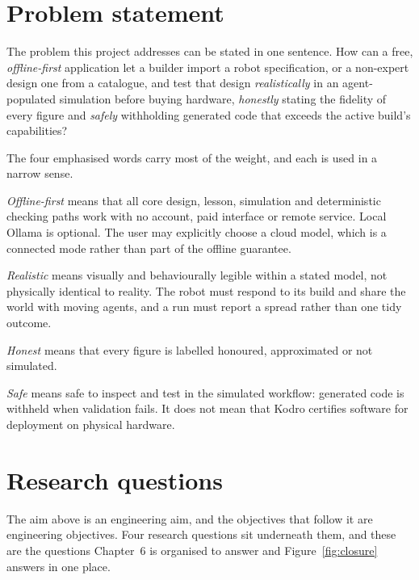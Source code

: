 \documentclass[11pt,a4paper]{report}
\begin{document}
\section{Problem statement}
The problem this project addresses can be stated in one sentence. How can a free, \emph{offline-first} application let a builder import a robot specification, or a non-expert design one from a catalogue, and test that design \emph{realistically} in an agent-populated simulation before buying hardware, \emph{honestly} stating the fidelity of every figure and \emph{safely} withholding generated code that exceeds the active build's capabilities?

The four emphasised words carry most of the weight, and each is used in a narrow sense.

 \emph{Offline-first} means that all core design, lesson, simulation and deterministic checking paths work with no account, paid interface or remote service. Local Ollama is optional. The user may explicitly choose a cloud model, which is a connected mode rather than part of the offline guarantee.

 \emph{Realistic} means visually and behaviourally legible within a stated model, not physically identical to reality. The robot must respond to its build and share the world with moving agents, and a run must report a spread rather than one tidy outcome.

\emph{Honest} means that every figure is labelled honoured, approximated or not simulated.

 \emph{Safe} means safe to inspect and test in the simulated workflow: generated code is withheld when validation fails. It does not mean that Kodro certifies software for deployment on physical hardware.

\section{Research questions}
The aim above is an engineering aim, and the objectives that follow it are engineering objectives. Four research questions sit underneath them, and these are the questions Chapter~6 is organised to answer and Figure~\ref{fig:closure} answers in one place.
\end{document}
